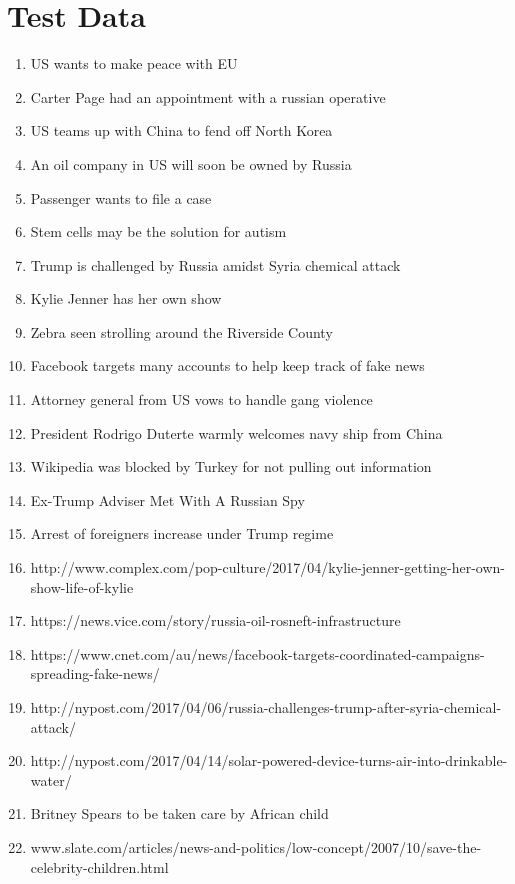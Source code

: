 \documentclass[journal]{./IEEEtran}
\begin{document}
    \section{Test Data}
    \label{appendix:sentences}
    \begin{enumerate}
		\item US wants to make peace with EU
		\item Carter Page had an appointment with a russian operative
		\item US teams up with China to fend off North Korea
		\item An oil company in US will soon be owned by Russia
		\item Passenger wants to file a case
		\item Stem cells may be the solution for autism
		\item Trump is challenged by Russia amidst Syria chemical attack
		\item Kylie Jenner has her own show
		\item Zebra seen strolling around the Riverside County
		\item Facebook targets many accounts to help keep track of fake news
		\item Attorney general from US vows to handle gang violence
		\item President Rodrigo Duterte warmly welcomes navy ship from China
		\item Wikipedia was blocked by Turkey for not pulling out information
		\item Ex-Trump Adviser Met With A Russian Spy
		\item Arrest of foreigners increase under Trump regime
		\item http://www.complex.com/pop-culture/2017/04/kylie-jenner-getting-her-own-show-life-of-kylie
		\item https://news.vice.com/story/russia-oil-rosneft-infrastructure
		\item https://www.cnet.com/au/news/facebook-targets-coordinated-campaigns-spreading-fake-news/
		\item http://nypost.com/2017/04/06/russia-challenges-trump-after-syria-chemical-attack/
		\item http://nypost.com/2017/04/14/solar-powered-device-turns-air-into-drinkable-water/
		\item Britney Spears to be taken care by African child
		\item www.slate.com/articles/news-and-politics/low-concept/2007/10/save-the-celebrity-children.html

\end{enumerate}
\end{document}
